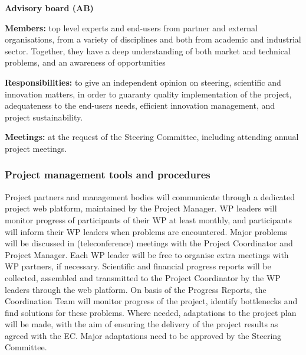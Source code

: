 \begin{description}
\item{\textbf{Advisory board (AB)}} \nobreak\par

  \textbf{Members:} top level experts and end-users from partner and
  external organisations, from a variety of disciplines and both from
  academic and industrial sector. Together, they have a deep
  understanding of both market and technical problems, and an
  awareness of opportunities

  \textbf{Responsibilities:} to give an independent opinion on
  steering, scientific and innovation matters, in order to guaranty
  quality implementation of the project, adequateness to the end-users
  needs, efficient innovation management, and project sustainability.


  \textbf{Meetings:} at the request of the Steering Committee, including attending annual project meetings.
\end{description}

\subsubsection{Project management tools and procedures}

Project partners and management bodies will communicate through
a dedicated project web platform, maintained by the Project
Manager. WP leaders will monitor progress of
participants of their WP at least monthly, and participants will inform their WP
leaders when problems are encountered. Major problems will be
discussed in (teleconference) meetings with the Project Coordinator
and Project Manager. Each WP leader will be free to organise
extra meetings with WP partners, if necessary. Scientific and
financial progress reports will be collected, assembled and
transmitted to the Project Coordinator by the WP leaders through the
web platform. On basis of the Progress Reports, the Coordination Team
will monitor progress of the project, identify bottlenecks and find
solutions for these problems. Where needed, adaptations to the project
plan will be made, with the aim of ensuring the delivery of the project
results as agreed with the EC. Major adaptations need to be approved
by the Steering Committee.

